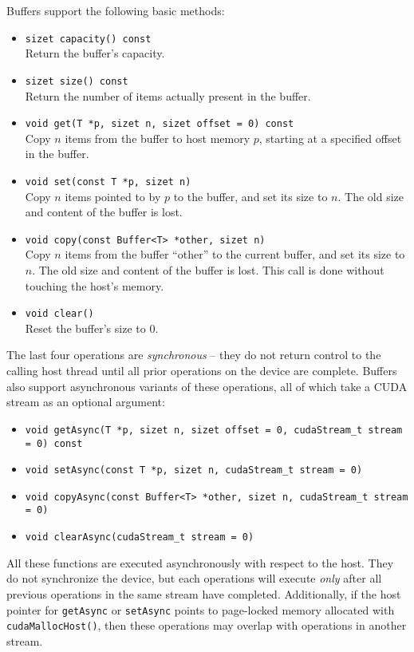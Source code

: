\documentclass[11pt]{article}
\newcommand{\sizet}{size\textunderscore{}t}
\begin{document}
Buffers support the following basic methods:
\begin{itemize}
\item \texttt{\sizet{} capacity() const} \\
  Return the buffer's capacity.
  
\item \texttt{\sizet{} size() const} \\
  Return the number of items actually present in the buffer.

\item \texttt{void get(T *p, \sizet{} n, \sizet{} offset = 0) const} \\
  Copy $n$ items from the buffer to host memory $p$, starting at
  a specified offset in the buffer.

\item \texttt{void set(const T *p, \sizet{} n)} \\
  Copy $n$ items pointed to by $p$ to the buffer, and set its size to $n$.
  The old size and content of the buffer is lost. 

\item \texttt{void copy(const Buffer<T> *other, \sizet{} n)} \\
  Copy $n$ items from the buffer ``other'' to the current buffer, and set
  its size to $n$. The old size and content of the buffer is lost. 
  This call is done without touching the host's memory.

\item \texttt{void clear()} \\
  Reset the buffer's size to 0.

\end{itemize}
The last four operations are \emph{synchronous} -- they do not return
control to the calling host thread until all prior operations on the
device are complete. Buffers also support asynchronous variants of these
operations, all of which take a CUDA stream as an optional argument:
\begin{itemize}

\item \texttt{void getAsync(T *p, \sizet{} n, \sizet{} offset = 0, cudaStream_t stream = 0) const}

\item \texttt{void setAsync(const T *p, \sizet{} n, cudaStream_t stream = 0)}

\item \texttt{void copyAsync(const Buffer<T> *other, \sizet{} n, cudaStream_t stream = 0)}

\item \texttt{void clearAsync(cudaStream_t stream = 0)}

\end{itemize}
All these functions are executed asynchronously with respect to the
host.  They do not synchronize the device, but each operations will
execute \emph{only} after all previous operations in the same stream
have completed.  Additionally, if the host pointer for
\texttt{getAsync} or \texttt{setAsync} points to page-locked memory
allocated with \texttt{cudaMallocHost()}, then these operations may
overlap with operations in another stream.
\end{document}
